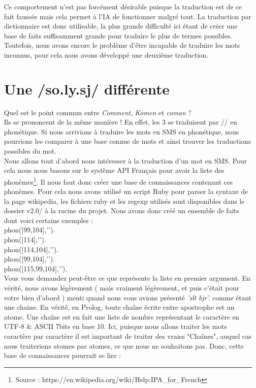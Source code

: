 \documentclass[11pt]{report}
\begin{document}
	Ce comportement n'est pas forcément désirable puisque la traduction est de ce fait faussée mais cela permet à l'IA de fonctionner malgré tout.
	La traduction par dictionnaire est donc utilisable, la plus grande difficulté ici étant de créer une base de faits suffisamment grande pour traduire le plus de termes possibles.\\
	Toutefois, nous avons encore le problème d'être incapable de traduire les mots inconnus, pour cela nous avons développé une deuxième traduction.
	
	\section{Une /so.ly.sj/ différente}
	Quel est le point commun entre {\em Comment}, {\em Komen} et {\em coman} ?\\
	Ils se prononcent de la même manière ! En effet, les 3 se traduisent par // en phonétique. Si nous arrivions à traduire les mots en SMS en phonétique, nous pourrions les comparer à une base connue de mots et ainsi trouver les traductions possibles du mot.\\
	Nous allons tout d'abord nous intéresser à la traduction d'un mot en SMS. Pour cela nous nous basons sur le système API Français pour avoir la liste des phonèmes\footnote{Source : https://en.wikipedia.org/wiki/Help:IPA\_for\_French}. Il nous faut donc créer une base de connaissances contenant ces phonèmes. Pour cela nous avons utilisé un script Ruby pour parser la syntaxe de la page wikipedia, les fichiers ruby et les regexp utilisés sont disponibles dans le dossier v2.0/ à la racine du projet.
	Nous avons donc créé un ensemble de faits dont voici certains exemples :\\
	
	\indent phon([99,104],'').\\
	\indent phon([114],'').\\
	\indent phon([114,104],'').\\
	\indent phon([99,104],'').\\
	\indent phon([115,99,104],'').\\
	
	Vous vous demandez peut-être ce que représente la liste en premier argument. En vérité, nous avons légèrement ( mais vraiment légèrement, et puis c'était pour votre bien d'abord ) menti quand nous vous avions présenté {\em 'slt bjr'.} comme étant une chaine. En vérité, en Prolog, toute chaîne écrite entre apostrophe est un atome. Une chaîne est en fait une liste de nombre représentant le caractère en UTF-8 \& ASCII 7bits en base 10. Ici, puisque nous allons traiter les mots caractère par caractère il est important de traiter des vraies "Chaînes", auquel cas nous traiterions atomes par atomes, ce que nous ne souhaitons pas. Donc, cette base de connaissances pourrait se lire :\\
	
\end{document}
